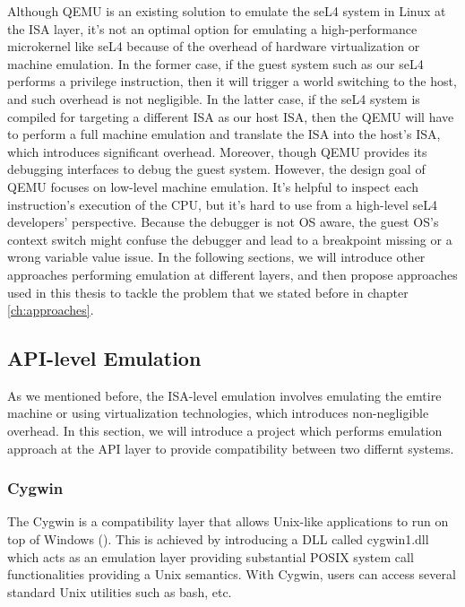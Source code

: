 Although QEMU is an existing solution to emulate the seL4 system in Linux at the ISA layer, it's not an optimal option for emulating a high-performance microkernel like seL4 because of the overhead of hardware virtualization or machine emulation. In the former case, if the guest system such as our seL4 performs a privilege instruction, then it will trigger a world switching to the host, and such overhead is not negligible. In the latter case, if the seL4 system is compiled for targeting a different ISA as our host ISA, then the QEMU will have to perform a full machine emulation and translate the ISA into the host's ISA, which introduces significant overhead. Moreover, though QEMU provides its debugging interfaces to debug the guest system. However, the design goal of QEMU focuses on low-level machine emulation. It's helpful to inspect each instruction's execution of the CPU, but it's hard to use from a high-level seL4 developers' perspective. Because the debugger is not OS aware, the guest OS's context switch might confuse the debugger and lead to a breakpoint missing or a wrong variable value issue. In the following sections, we will introduce other approaches performing emulation at different layers, and then propose approaches used in this thesis to tackle the problem that we stated before in chapter \ref{ch:approaches}.


\subsection{API-level Emulation}

As we mentioned before, the ISA-level emulation involves emulating the emtire machine or using virtualization technologies, which introduces non-negligible overhead. In this section, we will introduce a project which performs emulation approach at the API layer to provide compatibility between two differnt systems.

\subsubsection{Cygwin}


The Cygwin is a compatibility layer that allows Unix-like applications to run on top of Windows (\cite{enwikicygwin}). This is achieved by introducing a DLL called cygwin1.dll which acts as an emulation layer providing substantial POSIX system call functionalities providing a Unix semantics. With Cygwin, users can access several standard Unix utilities such as bash, etc.

